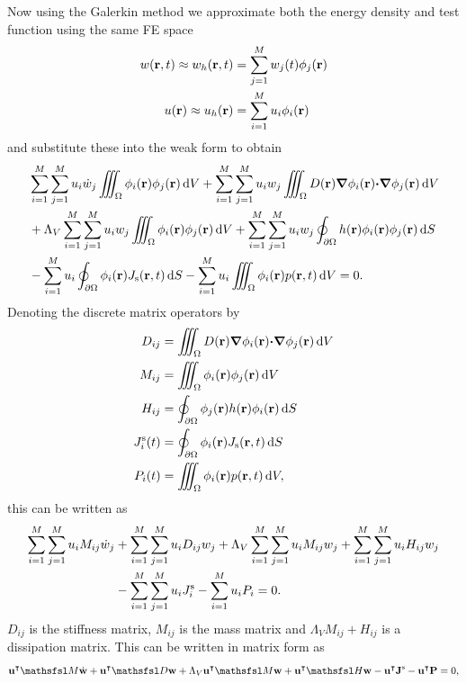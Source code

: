 \documentclass[a4paper]{article}
\numberwithin{equation}{section}
\providecommand\oiint{\oint}
\begin{document}
Now using the Galerkin method we approximate both the energy density and test function using
the same FE space
\begin{align}
w(\boldsymbol{\mathrm{r}},t) \approx w_h(\boldsymbol{\mathrm{r}},t) &= \sum_{j=1}^M w_j(t)\phi_j(\boldsymbol{\mathrm{r}}) \\
u(\boldsymbol{\mathrm{r}}) \approx u_h(\boldsymbol{\mathrm{r}}) &= \sum_{i=1}^M u_i\phi_i(\boldsymbol{\mathrm{r}})
\end{align}
and substitute these into the weak form to obtain
\begin{align}
&\sum_{i=1}^M\sum_{j=1}^M u_i \dot{w}_j \iiint_{\Omega} \phi_i\pr\phi_j\pr\dif{V}
+\sum_{i=1}^M\sum_{j=1}^M u_i w_j \iiint_{\Omega} D\pr\vnabla\phi_i\pr{\vcdot}{\vnabla}\phi_j\pr\dif{V} \nonumber \\
&+\Lambda_V\sum_{i=1}^M\sum_{j=1}^M u_i w_j \iiint_{\Omega} \phi_i\pr\phi_j\pr\dif{V} 
+\sum_{i=1}^M\sum_{j=1}^M u_i w_j \oiint_{\partial\Omega} h\pr\phi_i\pr\phi_j\pr\dif{S} \nonumber \\
&-\sum_{i=1}^M u_i \oiint_{\partial\Omega} \phi_i\pr J_\rs\prt\dif{S}
-\sum_{i=1}^M u_i\iiint_{\Omega} \phi_i\pr p\prt\dif{V}
= 0.
\end{align}
Denoting the discrete matrix operators by
\begin{align}
D_{ij} &= \iiint_{\Omega} D\pr{\vnabla}\phi_i\pr{\vcdot}{\vnabla}\phi_j\pr\dif{V} \\
M_{ij} &= \iiint_{\Omega} \phi_i\pr\phi_j\pr\dif{V} \\
H_{ij} &= \oiint_{\partial\Omega} \phi_j\pr h\pr \phi_i\pr\dif{S} \\
J_i^\rs(t) &= \oiint_{\partial\Omega} \phi_i\pr J_\rs\prt\dif{S} \\
P_i(t) &= \iiint_{\Omega} \phi_i\pr p\prt \dif{V},
\end{align}
this can be written as
\begin{align}
\sum_{i=1}^M\sum_{j=1}^M u_i M_{ij} \dot{w}_j 
&+\sum_{i=1}^M\sum_{j=1}^M u_i D_{ij} w_j 
+\Lambda_V\sum_{i=1}^M\sum_{j=1}^M u_i M_{ij} w_j 
+\sum_{i=1}^M\sum_{j=1}^M u_i H_{ij} w_j \nonumber \\
&-\sum_{i=1}^M\sum_{j=1}^M u_i J^{\mathrm{s}}_i
-\sum_{i=1}^M u_i P_i
= 0.
\end{align}
$D_{ij}$ is the stiffness matrix, $M_{ij}$ is the mass
matrix and $\Lambda_V M_{ij}+H_{ij}$ is a dissipation matrix. This can be written in matrix form as
\begin{align}
\vec{u}^\intercal \mM \dot{\vec{w}} + \vec{u}^\intercal\mD \vec{w} +\Lambda_V \vec{u}^\intercal\mM \vec{w}+ \vec{u}^\intercal\mH \vec{w}
-\vec{u}^\intercal\vec{J}^\rs -\vec{u}^\intercal\vec{P} = 0,
\end{align}
\end{document}
